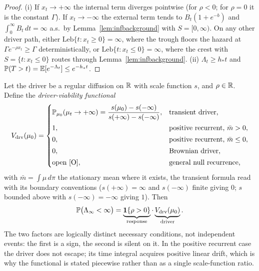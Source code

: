 
\begin{proof}
(i) If $x_t\to+\infty$ the internal term diverges pointwise (for
$\rho<0$; for $\rho=0$ it is the constant $\Gamma$). If
$x_t\to-\infty$ the external term tends to $B_t(1+e^{-b})$ and
$\int_0^\infty B_t\,dt=\infty$ a.s.\ by
Lemma~\ref{lem:infbackground} with $S=[0,\infty)$. On any other
driver path, either $\mathrm{Leb}\{t:x_t\ge0\}=\infty$, where the
trough floors the hazard at $\Gamma e^{-\rho x_t}\ge\Gamma$
deterministically, or $\mathrm{Leb}\{t:x_t\le0\}=\infty$, where the
crest with $S=\{t:x_t\le0\}$ routes through
Lemma~\ref{lem:infbackground}. (ii) $\Lambda_t\ge h_\ast t$ and
$\mathbb{P}(T>t)=\mathbb{E}[e^{-\Lambda_t}]\le e^{-h_\ast t}$.
\end{proof}

\begin{theorem}\label{thm:twocond}
Let the driver be a regular diffusion on $\mathbb{R}$ with scale function $s$,
and $\rho\in\mathbb{R}$. Define the \emph{driver-viability functional}
\begin{equation}\label{eq:vdrv}
V_{\mathrm{drv}}(\mu_0)=
\begin{cases}
\mathbb{P}_{\mu_0}(\mu_t\to+\infty)=\dfrac{s(\mu_0)-s(-\infty)}{s(+\infty)-s(-\infty)},
& \text{transient driver,}\\[8pt]
1, & \text{positive recurrent, }\bar m>0,\\[2pt]
0, & \text{positive recurrent, }\bar m\le0,\\[2pt]
0, & \text{Brownian driver,}\\[2pt]
\text{open [O]}, & \text{general null recurrence,}
\end{cases}
\end{equation}
with $\bar m=\int\mu\,d\pi$ the stationary mean where it exists, the
transient formula read with its boundary conventions ($s(+\infty)=\infty$
and $s(-\infty)$ finite giving $0$; $s$ bounded above with
$s(-\infty)=-\infty$ giving $1$). Then
\begin{equation}\label{eq:twocond}
\mathbb{P}\bigl(\Lambda_\infty<\infty\bigr)
=\underbrace{\mathbf{1}\{\rho>0\}}_{\text{response}}
\cdot
\underbrace{V_{\mathrm{drv}}(\mu_0)}_{\text{driver}}.
\end{equation}
The two factors are logically distinct necessary conditions, not
independent events: the first is a sign, the second is silent on it.
In the positive recurrent case the driver does not escape; its time
integral acquires positive linear drift, which is why the functional
is stated piecewise rather than as a single scale-function ratio.
\end{theorem}

